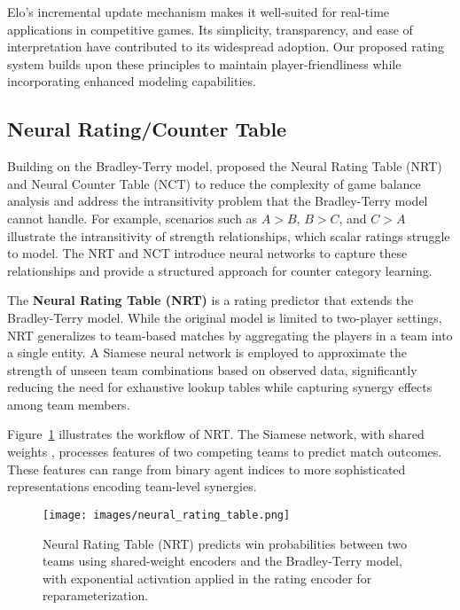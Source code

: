 Elo's incremental update mechanism makes it well-suited for real-time applications in competitive games. Its simplicity, transparency, and ease of interpretation have contributed to its widespread adoption. Our proposed rating system builds upon these principles to maintain player-friendliness while incorporating enhanced modeling capabilities.

\subsection{Neural Rating/Counter Table}

Building on the Bradley-Terry model, \citet{game_balance_analysis} proposed the Neural Rating Table (NRT) and Neural Counter Table (NCT) to reduce the complexity of game balance analysis and address the intransitivity problem that the Bradley-Terry model cannot handle. For example, scenarios such as $A > B$, $B > C$, and $C > A$ illustrate the intransitivity of strength relationships, which scalar ratings struggle to model. The NRT and NCT introduce neural networks to capture these relationships and provide a structured approach for counter category learning.

The \textbf{Neural Rating Table (NRT)} is a rating predictor that extends the Bradley-Terry model. While the original model is limited to two-player settings, NRT generalizes to team-based matches by aggregating the players in a team into a single entity. A Siamese neural network is employed to approximate the strength of unseen team combinations based on observed data, significantly reducing the need for exhaustive lookup tables while capturing synergy effects among team members.

Figure~\ref{figure:neural_rating_table} illustrates the workflow of NRT. The Siamese network, with shared weights \citep{siamese_network}, processes features of two competing teams to predict match outcomes. These features can range from binary agent indices to more sophisticated representations encoding team-level synergies.

\begin{figure}[t]
    \centering
    \texttt{[image: images/neural\_rating\_table.png]}
    \caption{Neural Rating Table (NRT) predicts win probabilities between two teams using shared-weight encoders and the Bradley-Terry model, with exponential activation applied in the rating encoder for reparameterization.}
    \label{figure:neural_rating_table}
\end{figure}

